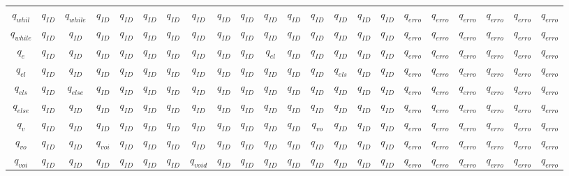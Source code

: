 \documentclass[12pt]{article}
\begin{document}
\begin{landscape}
\begin{table}[htbp]
\begin{tabular}{|c|c|ccccc|ccccccccc|c|c|c|c|c|c|}
$q_{whil}$ & $q_{ID}$ & $q_{while}$ & $q_{ID}$ & $q_{ID}$ & $q_{ID}$ & $q_{ID}$ & $q_{ID}$ & $q_{ID}$ & $q_{ID}$ & $q_{ID}$ & $q_{ID}$ & $q_{ID}$ & $q_{ID}$ & $q_{ID}$ & $q_{ID}$ & $q_{erro}$ & $q_{erro}$ & $q_{erro}$ & $q_{erro}$ & $q_{erro}$ & $q_{erro}$ \\
$q_{while}$ & $q_{ID}$ & $q_{ID}$ & $q_{ID}$ & $q_{ID}$ & $q_{ID}$ & $q_{ID}$ & $q_{ID}$ & $q_{ID}$ & $q_{ID}$ & $q_{ID}$ & $q_{ID}$ & $q_{ID}$ & $q_{ID}$ & $q_{ID}$ & $q_{ID}$ & $q_{erro}$ & $q_{erro}$ & $q_{erro}$ & $q_{erro}$ & $q_{erro}$ & $q_{erro}$ \\
$q_e$ & $q_{ID}$ & $q_{ID}$ & $q_{ID}$ & $q_{ID}$ & $q_{ID}$ & $q_{ID}$ & $q_{ID}$ & $q_{ID}$ & $q_{ID}$ & $q_{el}$ & $q_{ID}$ & $q_{ID}$ & $q_{ID}$ & $q_{ID}$ & $q_{ID}$ & $q_{erro}$ & $q_{erro}$ & $q_{erro}$ & $q_{erro}$ & $q_{erro}$ & $q_{erro}$ \\
$q_{el}$ & $q_{ID}$ & $q_{ID}$ & $q_{ID}$ & $q_{ID}$ & $q_{ID}$ & $q_{ID}$ & $q_{ID}$ & $q_{ID}$ & $q_{ID}$ & $q_{ID}$ & $q_{ID}$ & $q_{ID}$ & $q_{els}$ & $q_{ID}$ & $q_{ID}$ & $q_{erro}$ & $q_{erro}$ & $q_{erro}$ & $q_{erro}$ & $q_{erro}$ & $q_{erro}$ \\
$q_{els}$ & $q_{ID}$ & $q_{else}$ & $q_{ID}$ & $q_{ID}$ & $q_{ID}$ & $q_{ID}$ & $q_{ID}$ & $q_{ID}$ & $q_{ID}$ & $q_{ID}$ & $q_{ID}$ & $q_{ID}$ & $q_{ID}$ & $q_{ID}$ & $q_{ID}$ & $q_{erro}$ & $q_{erro}$ & $q_{erro}$ & $q_{erro}$ & $q_{erro}$ & $q_{erro}$ \\
$q_{else}$ & $q_{ID}$ & $q_{ID}$ & $q_{ID}$ & $q_{ID}$ & $q_{ID}$ & $q_{ID}$ & $q_{ID}$ & $q_{ID}$ & $q_{ID}$ & $q_{ID}$ & $q_{ID}$ & $q_{ID}$ & $q_{ID}$ & $q_{ID}$ & $q_{ID}$ & $q_{erro}$ & $q_{erro}$ & $q_{erro}$ & $q_{erro}$ & $q_{erro}$ & $q_{erro}$ \\
$q_v$ & $q_{ID}$ & $q_{ID}$ & $q_{ID}$ & $q_{ID}$ & $q_{ID}$ & $q_{ID}$ & $q_{ID}$ & $q_{ID}$ & $q_{ID}$ & $q_{ID}$ & $q_{ID}$ & $q_{vo}$ & $q_{ID}$ & $q_{ID}$ & $q_{ID}$ & $q_{erro}$ & $q_{erro}$ & $q_{erro}$ & $q_{erro}$ & $q_{erro}$ & $q_{erro}$ \\
$q_{vo}$ & $q_{ID}$ & $q_{ID}$ & $q_{voi}$ & $q_{ID}$ & $q_{ID}$ & $q_{ID}$ & $q_{ID}$ & $q_{ID}$ & $q_{ID}$ & $q_{ID}$ & $q_{ID}$ & $q_{ID}$ & $q_{ID}$ & $q_{ID}$ & $q_{ID}$ & $q_{erro}$ & $q_{erro}$ & $q_{erro}$ & $q_{erro}$ & $q_{erro}$ & $q_{erro}$ \\
$q_{voi}$ & $q_{ID}$ & $q_{ID}$ & $q_{ID}$ & $q_{ID}$ & $q_{ID}$ & $q_{ID}$ & $q_{void}$ & $q_{ID}$ & $q_{ID}$ & $q_{ID}$ & $q_{ID}$ & $q_{ID}$ & $q_{ID}$ & $q_{ID}$ & $q_{ID}$ & $q_{erro}$ & $q_{erro}$ & $q_{erro}$ & $q_{erro}$ & $q_{erro}$ & $q_{erro}$ \\

\end{tabular}
\end{table}
\end{landscape}
\end{document}
